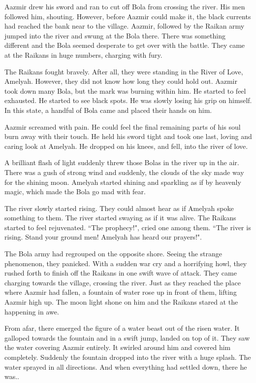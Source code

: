\documentclass[twoside,11pt,titlepage]{article}
\begin{document}
Aazmir drew his sword and ran to cut off Bola from crossing the river. His men followed him, shouting. However, before Aazmir could make it, the black currents had reached the bank near to the village. Aazmir, followed by the Raikan army jumped into the river and swung at the Bola there. There was something different and the Bola seemed desperate to get over with the battle. They came at the Raikans in huge numbers, charging with fury.

The Raikans fought bravely. After all, they were standing in the River of Love, Amelyah. However, they did not know how long they could hold out. Aazmir took down many Bola, but the mark was burning within him. He started to feel exhausted. He started to see black spots. He was slowly losing his grip on himself. In this state, a handful of Bola came and placed their hands on him.

Aazmir screamed with pain. He could feel the final remaining parts of his soul burn away with their touch. He held his sword tight and took one last, loving and caring look at Amelyah. He dropped on his knees, and fell, into the river of love.

A brilliant flash of light suddenly threw those Bolas in the river up in the air. There was a gush of strong wind and suddenly, the clouds of the sky made way for the shining moon. Amelyah started shining and sparkling as if by heavenly magic, which made the Bola go mad with fear.

The river slowly started rising. They could almost hear as if Amelyah spoke something to them. The river started swaying as if it was alive. The Raikans started to feel rejuvenated. ``The prophecy!", cried one among them. ``The river is rising. Stand your ground men! Amelyah has heard our prayers!".

The Bola army had regrouped on the opposite shore. Seeing the strange phenomenon, they panicked. With a sudden war cry and a horrifying howl, they rushed forth to finish off the Raikans in one swift wave of attack. They came charging towards the village, crossing the river. Just as they reached the place where Aazmir had fallen, a fountain of water rose up in front of them, lifting Aazmir high up. The moon light shone on him and the Raikans stared at the happening in awe.

From afar, there emerged the figure of a water beast out of the risen water. It galloped towards the fountain and in a swift jump, landed on top of it. They saw the water covering Aazmir entirely. It swirled around him and covered him completely. Suddenly the fountain dropped into the river with a huge splash. The water sprayed in all directions. And when everything had settled down, there he was..
\end{document}
